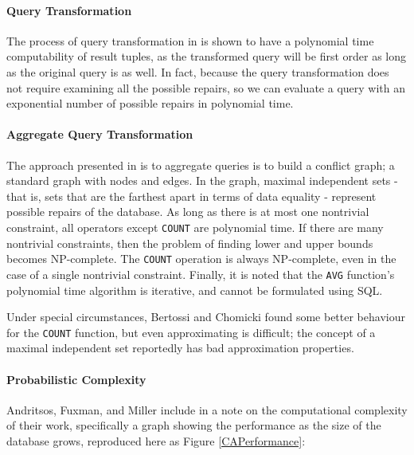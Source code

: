 \paragraph{Query Transformation} 
The process of query transformation in \cite{CQ} is shown to have a polynomial time computability of result tuples, as the transformed query will be first order as long as the original query is as well. In fact, because the query transformation does not require examining all the possible repairs, so we can evaluate a query with an exponential number of possible repairs in polynomial time.

\paragraph{Aggregate Query Transformation}
The approach presented in \cite{CQ} is to aggregate queries is to build a conflict graph; a standard graph with nodes and edges. In the graph, maximal independent sets - that is, sets that are the farthest apart in terms of data equality - represent possible repairs of the database. As long as there is at most one nontrivial constraint, all operators except \texttt{COUNT} are polynomial time. If there are many nontrivial constraints, then the problem of finding lower and upper bounds becomes NP-complete. The \texttt{COUNT} operation is always NP-complete, even in the case of a single nontrivial constraint. Finally, it is noted that the \texttt{AVG} function's polynomial time algorithm is iterative, and cannot be formulated using SQL. 

Under special circumstances, Bertossi and Chomicki found some better behaviour for the \texttt{COUNT} function, but even approximating is difficult; the concept of a maximal independent set reportedly has bad approximation properties.

\paragraph{Probabilistic Complexity}
Andritsos, Fuxman, and Miller include in \cite{CA} a note on the computational complexity of their work, specifically a graph showing the performance as the size of the database grows, reproduced here as Figure \ref{CAPerformance}:

